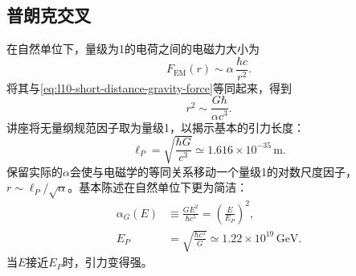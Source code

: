 \begin{classroomqa}
\end{classroomqa}

\subsection{普朗克交叉}

在自然单位下，量级为1的电荷之间的电磁力大小为
\begin{equation}
  F_{\mathrm{EM}}(r)
  \sim
  \alpha\,\frac{\hbar c}{r^2}.
  \label{eq:l10-em-force-alpha}
\end{equation}
将其与\eqref{eq:l10-short-distance-gravity-force}等同起来，得到
\begin{equation}
  r^2\sim\frac{G\hbar}{\alpha c^3}.
  \label{eq:l10-gravity-em-crossing}
\end{equation}
讲座将无量纲规范因子取为量级1，以揭示基本的引力长度：
\begin{equation}
  \boxed{\ell_P=\sqrt{\frac{\hbar G}{c^3}}}
  \simeq1.616\times10^{-35}\,\mathrm{m}.
  \label{eq:l10-planck-length}
\end{equation}
保留实际的\(\alpha\)会使与电磁学的等同关系移动一个量级1的对数尺度因子，\(r\sim\ell_P/\sqrt\alpha\)。基本陈述在自然单位下更为简洁：
\begin{equation}
\begin{aligned}
  \alpha_G(E)
  &\equiv\frac{GE^2}{\hbar c^5}
  =\left(\frac{E}{E_P}\right)^2,
  \\
  E_P
  &=\sqrt{\frac{\hbar c^5}{G}}
  \simeq1.22\times10^{19}\,\mathrm{GeV}.
\end{aligned}
  \label{eq:l10-gravitational-coupling}
\end{equation}
当\(E\)接近\(E_P\)时，引力变得强。

\begin{classroomqa}
\end{classroomqa}

\begin{classroomqa}
\end{classroomqa}

